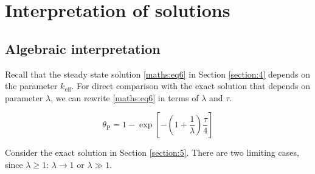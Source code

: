 \documentclass{article}
\newcommand{\thetaP}{\theta_{\text{P}}}
\begin{document}
\section{Interpretation of solutions} \label{section:6}

\subsection{Algebraic interpretation} \label{subsection:6.1}

Recall that the steady state solution \eqref{maths:eq6} in Section \ref{section:4} depends on the parameter $k_{\text{eff}}$. For direct comparison with the exact solution that depends on parameter $\lambda$, we can rewrite \eqref{maths:eq6} in terms of $\lambda$ and $\tau$.

\[
\thetaP = 1 - \exp \left[ -\left( 1 + \frac{1}{\lambda} \right) \frac{\tau}{4} \right]
\]

Consider the exact solution in Section \ref{section:5}. There are two limiting cases, since $\lambda \geq 1$: $\lambda \to 1$ or $\lambda \gg 1$.
\end{document}
